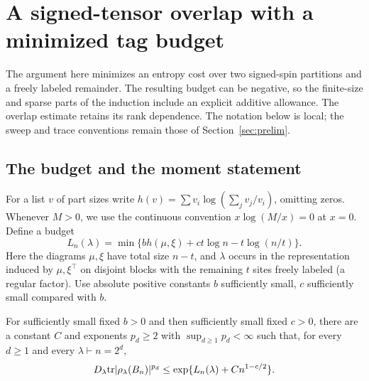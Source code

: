 \section{A signed-tensor overlap with a minimized tag budget}
\label{ten:compressed}
The argument here minimizes an entropy cost over two signed-spin partitions and a freely labeled remainder. The resulting budget can be negative, so the finite-size and sparse parts of the induction include an explicit additive allowance. The overlap estimate retains its rank dependence.
\smallskip
The notation below is local; the sweep and trace conventions remain those of Section~\ref{sec:prelim}.

\subsection{The budget and the moment statement}
For a list \(v\) of part sizes write
\(h(v)=\sum v_i\log(\sum_j v_j/v_i)\), omitting zeros. Whenever
\(M>0\), we use the continuous convention \(x\log(M/x)=0\) at \(x=0\).
Define a budget
\[
L_n(\lambda)=\min\{ b h(\mu,\xi)+ c t\log n-t\log(n/t)\}.
\]
Here the diagrams \(\mu,\xi\) have total size \(n-t\), and \(\lambda\) occurs in the representation induced by \(\mu,\xi^\top\) on disjoint blocks with the remaining \(t\) sites freely labeled (a regular factor). Use absolute positive constants \(b\) sufficiently small, \(c\) sufficiently small compared with \(b\).

\begin{proposition}
\label{ten:compressed:main}
For sufficiently small fixed \(b>0\) and then sufficiently small fixed
\(c>0\), there are a constant \(C\) and exponents \(p_d\ge2\) with
\(\sup_{d\ge1}p_d<\infty\) such that, for every \(d\ge1\) and
every \(\lambda\vdash n=2^d\),
\begin{equation}
 D_\lambda {\rm tr}|\rho_\lambda(B_n)|^{p_d}\le
 \exp\{L_n(\lambda)+C n^{1-c/2}\}.
 \label{ten:compressed:eq:1}
\end{equation}
\end{proposition}

